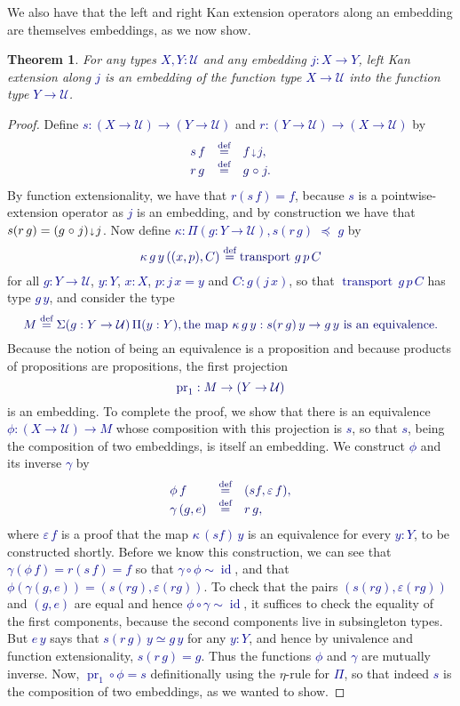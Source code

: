 \documentclass[10pt]{article}
\newcommand{\db}{\textcolor{darkblue}}
\newcommand{\m}[1]{\db{$#1$}}
\newcommand{\M}[1]{\[\db{#1}\]}
\newcommand{\transport}{\operatorname{transport}}
\newcommand{\fst}{\operatorname{pr}_1}
\newcommand{\id}{\operatorname{id}}
\newcommand{\comp}{\mathrel{\circ}}
\newcommand{\U}{\mathcal{U}}
\newcommand{\eqdef}{\overset{\text{def}}{=}}
\newcommand{\edown}{\scaleobj{0.7}{\,\downarrow\,}}
\newcommand{\wps}{\mathrel{\,\,\preceq\,\,}}
\newtheorem{theorem}[numbered]{Theorem}
\theoremstyle{definition}
\begin{document}
We also have that the left and right Kan extension operators along an
embedding are themselves embeddings, as we now show.
\begin{theorem}
For any types \m{X,Y:\U} and any embedding \m{j : X \to Y}, left Kan extension along \m{j} is an embedding of the function type \m{X \to \U} into the function type \m{Y \to \U}.
\end{theorem}
\begin{proof}
  Define \m{s : (X \to \U) \to (Y \to \U)} and \m{r : (Y \to \U) \to (X \to \U)} by
  \M{
    \begin{array}{lll}
      s \, f & \eqdef & f \edown j, \\
      r \,  g & \eqdef & g \comp j.
    \end{array}
  }
  By function extensionality, we have that \m{r (s \, f) = f}, because
  \m{s} is a pointwise-extension operator as \m{j} is an embedding,
  and by construction we have that \m{s (r \, g) = (g \comp j) \edown
    j}. Now define \m{\kappa : \Pi (g : Y \to \U), s(r \,g) \wps
    g} by
  \M{
    \kappa \, g \, y \, ((x , p) , C) \eqdef \transport \, g \, p \, C
  }
  for all \m{g : Y \to \U}, \m{y : Y}, \m{x : X}, \m{p : j \, x = y} and \m{C : g(j \, x)}, so that
  \m{\transport \, g \, p \, C} has type \m{g \, y },
  and consider the type
  \M{
    M \eqdef \Sigma (g : Y \to \U)\,\Pi(y:Y), \text{the map \m{\kappa \, g \, y : s (r \, g) \, y \to g \, y} is an equivalence.}
  }
  Because the notion of being an equivalence is a proposition and
  because products of propositions are propositions, the first projection
  \M{\fst : M \to (Y \to \U)} is an embedding.  To complete the proof,
  we show that there is an equivalence \m{\phi : (X \to \U) \to M}
  whose composition with this projection is \m{s}, so that \m{s},
  being the composition of two embeddings, is itself an embedding.  We
  construct \m{\phi} and its inverse \m{\gamma} by
  \M{
    \begin{array}{lll}
      \phi \, f & \eqdef & (s f , \varepsilon \, f), \\
      \gamma \, (g , e) & \eqdef & r \, g,
    \end{array}
  }
  where \m{\varepsilon \, f} is a proof that the map \m{\kappa \, (s
    f) \, y} is an equivalence for every \m{y : Y}, to be constructed
  shortly.  Before we know this construction, we can see that \m{\gamma
    (\phi \, f) = r (s \, f) = f} so that \m{\gamma \comp \phi \sim
    \id}, and that \m{\phi (\gamma (g , e)) = (s(r g) , \varepsilon (r
    g))}.  To check that the pairs \m{(s(r g) , \varepsilon (r g))}
  and \m{(g , e)} are equal and hence \m{\phi \comp \gamma \sim \id},
  it suffices to check the equality of the first components, because
  the second components live in subsingleton types.  But \m{e \, y}
  says that \m{s (r \, g) \, y \simeq g \, y} for any \m{y:Y}, and
  hence by univalence and function extensionality, \m{s (r \, g) = g}.
  Thus the functions \m{\phi} and \m{\gamma} are mutually
  inverse. Now, \m{\fst \comp \phi = s} definitionally using the
  $\eta$-rule for \m{\Pi}, so that indeed \m{s} is the composition of
  two embeddings, as we wanted to show.


\end{proof}
\end{document}
